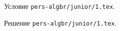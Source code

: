 \problem
Условие \texttt{pers-algbr/junior/1.tex}.

\solution Решение \texttt{pers-algbr/junior/1.tex}.
\endproblem

